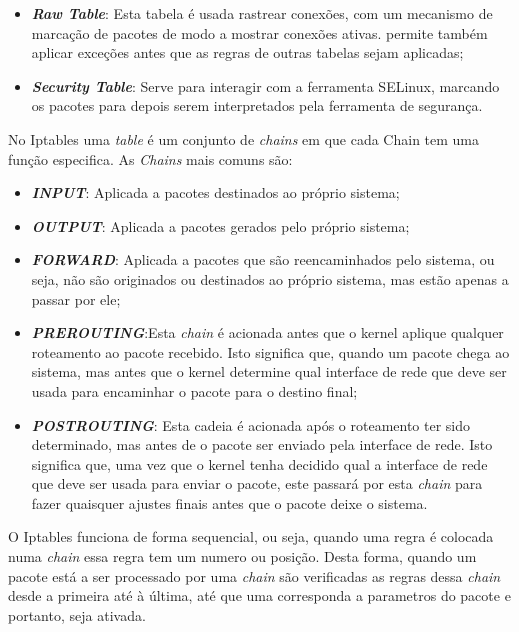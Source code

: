 \begin{itemize}
\item \textbf{\textit{Raw Table}}: Esta tabela é usada rastrear conexões, com um mecanismo de
marcação de pacotes de modo a mostrar conexões ativas. permite também aplicar
exceções antes que as regras de outras tabelas sejam aplicadas;
\item \textbf{\textit{Security Table}}: Serve para interagir com a ferramenta SELinux, marcando
os pacotes para depois serem interpretados pela ferramenta de segurança.
\end{itemize}



No Iptables uma \textit{table} é um conjunto de \textit{chains} em que cada Chain tem uma função
especifica. As \textit{Chains} mais comuns são:

\begin{itemize}
\item \textbf{\textit{INPUT}}: Aplicada a pacotes destinados ao próprio sistema;
\item \textbf{\textit{OUTPUT}}: Aplicada a pacotes gerados pelo próprio sistema;
\item \textbf{\textit{FORWARD}}: Aplicada a pacotes que são reencaminhados pelo sistema,
ou seja, não são originados ou destinados ao próprio sistema, mas estão apenas a passar
por ele;
\item \textbf{\textit{PREROUTING}}:Esta \textit{chain} é acionada antes que o kernel 
aplique qualquer roteamento ao pacote recebido. Isto significa que, quando um pacote 
chega ao sistema, mas antes que o kernel determine qual interface de rede que deve ser 
usada para encaminhar o pacote para o destino final;
\item \textbf{\textit{POSTROUTING}}: Esta cadeia é acionada após o roteamento 
ter sido determinado, mas antes de o pacote ser enviado pela interface de rede.
Isto significa que, uma vez que o kernel tenha decidido qual a interface de rede que
deve ser usada para enviar o pacote, este passará por esta \textit{chain} para fazer 
quaisquer ajustes finais antes que o pacote deixe o sistema.
\end{itemize}


O Iptables funciona de forma sequencial, ou seja, quando uma regra é colocada
numa \textit{chain} essa regra tem um numero ou posição. Desta forma, quando um 
pacote está a ser processado por uma \textit{chain} são verificadas as regras 
dessa \textit{chain} desde a primeira até à última, até que uma corresponda a
parametros do pacote e portanto, seja ativada.

